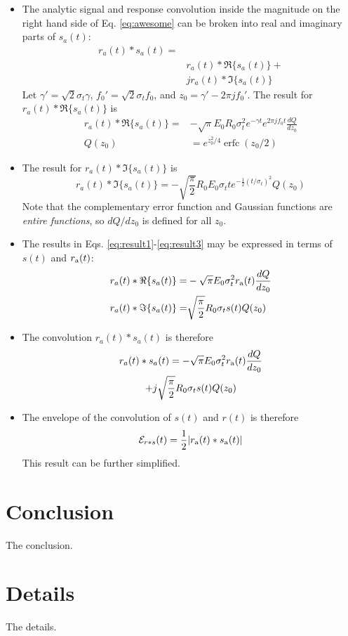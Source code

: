 \documentclass[amsmath,amssymb,aps,prd,10pt,twocolumn,showkeys]{revtex4}
\DeclareMathOperator\erfc{erfc}
\begin{document}
\begin{itemize}
\item The analytic signal and response convolution inside the magnitude on the right hand side of Eq. \ref{eq:awesome} can be broken into real and imaginary parts of $s_a(t)$:
\begin{align}
r_a (t) * s_a(t) = & \\ 
& r_a(t) * \Re\lbrace s_a(t)\rbrace + \\ 
& j r_a(t) * \Im\lbrace s_a(t)\rbrace
\end{align}
Let $\gamma' = \sqrt{2}\sigma_t \gamma$, $f_0' = \sqrt{2} \sigma_t f_0$, and $z_0 = \gamma' - 2\pi j f_0'$.  The result for $r_a(t) * \Re\lbrace s_a(t)\rbrace$ is
\begin{align}
r_a(t) * \Re\lbrace s_a(t)\rbrace =& -\sqrt{\pi} E_0 R_0 \sigma_t^2 e^{-\gamma t} e^{2\pi j f_0 t} \frac{dQ}{dz_0} \label{eq:result1} \\
Q(z_0) &= e^{z_0^2/4} \erfc(z_0/2) \label{eq:result2}
\end{align}
\item The result for $r_a(t) * \Im\lbrace s_a(t)\rbrace$ is
\begin{equation}
r_a(t) * \Im\lbrace s_a(t)\rbrace = -\sqrt{\frac{\pi}{2}} R_0 E_0 \sigma_t t e^{-\frac{1}{2}(t/\sigma_t)^2} Q(z_0) \label{eq:result3}
\end{equation}
Note that the complementary error function and Gaussian functions are \textit{entire functions}, so $dQ/dz_0$ is defined for all $z_0$.
\item The results in Eqs. \ref{eq:result1}-\ref{eq:result3} may be expressed in terms of $s(t)$ and $r_{\rm a}(t)$:
\begin{align}
r_a(t) * \Re\lbrace s_a(t)\rbrace =& -\sqrt{\pi} E_0 \sigma_t^2 r_{\rm a}(t) \frac{dQ}{dz_0} \\
r_a(t) * \Im\lbrace s_a(t)\rbrace =& \sqrt{\frac{\pi}{2}} R_0 \sigma_t s(t) Q(z_0)
\end{align}
\item The convolution $r_a (t) * s_a(t)$ is therefore
\begin{multline}
r_a (t) * s_a(t) = -\sqrt{\pi} E_0 \sigma_t^2 r_{\rm a}(t) \frac{dQ}{dz_0} \\ + j\sqrt{\frac{\pi}{2}} R_0 \sigma_t s(t) Q(z_0)
\end{multline}
\item The envelope of the convolution of $s(t)$ and $r(t)$ is therefore
\begin{equation}
\mathcal{E}_{r * s}(t) = \frac{1}{2}|r_{\rm a}(t) * s_{\rm a}(t)|
\end{equation}
This result can be further simplified.
\end{itemize}

\section{Conclusion}
\label{sec:conc}

The conclusion.

\appendix

\section{Details}
\label{app:a}

The details.


\end{document}
